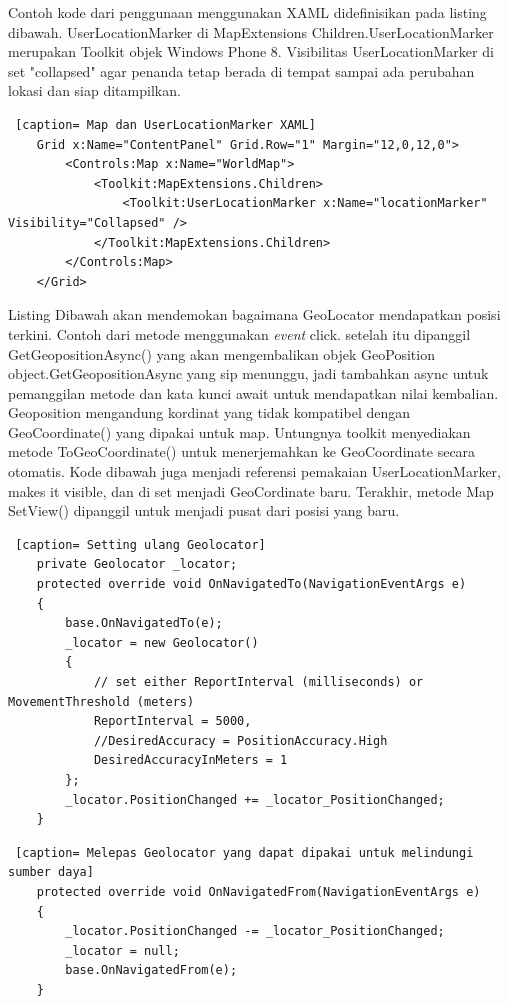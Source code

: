 \hspace{0.5cm} Contoh kode dari penggunaan menggunakan XAML didefinisikan pada listing dibawah. UserLocationMarker di MapExtensions Children.UserLocationMarker merupakan Toolkit objek Windows Phone 8. Visibilitas UserLocationMarker di set "collapsed" agar penanda tetap berada di tempat sampai ada perubahan lokasi dan siap ditampilkan.

\begin{lstlisting} [caption= Map dan UserLocationMarker XAML]
	Grid x:Name="ContentPanel" Grid.Row="1" Margin="12,0,12,0">
		<Controls:Map x:Name="WorldMap">
			<Toolkit:MapExtensions.Children>
				<Toolkit:UserLocationMarker x:Name="locationMarker" Visibility="Collapsed" />
			</Toolkit:MapExtensions.Children>
		</Controls:Map>
	</Grid>
\end{lstlisting}

\hspace{0.5cm} Listing Dibawah akan mendemokan bagaimana GeoLocator mendapatkan posisi terkini. Contoh dari metode menggunakan \textit{event} click. setelah itu dipanggil GetGeopositionAsync() yang akan mengembalikan objek GeoPosition object.GetGeopositionAsync yang sip menunggu, jadi tambahkan async untuk pemanggilan metode dan kata kunci await untuk mendapatkan nilai kembalian. Geoposition mengandung kordinat yang tidak kompatibel dengan GeoCoordinate() yang dipakai untuk map. Untungnya toolkit menyediakan metode ToGeoCoordinate() untuk menerjemahkan ke GeoCoordinate secara otomatis. Kode dibawah juga menjadi referensi pemakaian UserLocationMarker, makes it visible, dan di set menjadi GeoCordinate baru. Terakhir, metode Map SetView() dipanggil untuk menjadi pusat dari posisi yang baru.

\begin{lstlisting} [caption= Setting ulang Geolocator]
	private Geolocator _locator;
	protected override void OnNavigatedTo(NavigationEventArgs e)
	{
		base.OnNavigatedTo(e);
		_locator = new Geolocator()
		{
			// set either ReportInterval (milliseconds) or MovementThreshold (meters)
			ReportInterval = 5000,
			//DesiredAccuracy = PositionAccuracy.High
			DesiredAccuracyInMeters = 1
		};
		_locator.PositionChanged += _locator_PositionChanged;
	}
\end{lstlisting}

\begin{lstlisting} [caption= Melepas Geolocator yang dapat dipakai untuk melindungi sumber daya]
	protected override void OnNavigatedFrom(NavigationEventArgs e)
	{
		_locator.PositionChanged -= _locator_PositionChanged;
		_locator = null;
		base.OnNavigatedFrom(e);
	}
\end{lstlisting}

